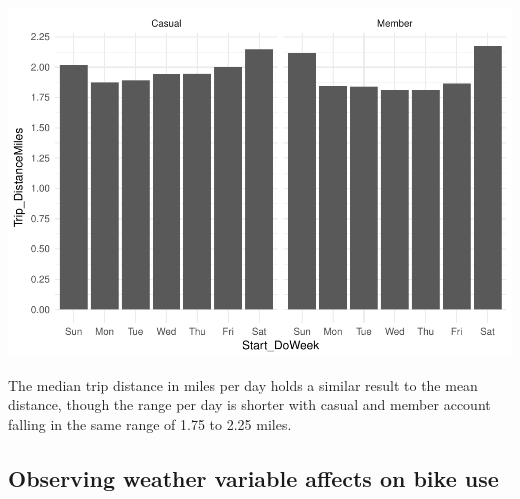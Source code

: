 \documentclass[]{article}
\newenvironment{Shaded}{\begin{snugshade}}{\end{snugshade}}
\newcommand{\KeywordTok}[1]{\textcolor[rgb]{0.13,0.29,0.53}{\textbf{#1}}}
\newcommand{\DataTypeTok}[1]{\textcolor[rgb]{0.13,0.29,0.53}{#1}}
\newcommand{\DecValTok}[1]{\textcolor[rgb]{0.00,0.00,0.81}{#1}}
\newcommand{\FloatTok}[1]{\textcolor[rgb]{0.00,0.00,0.81}{#1}}
\newcommand{\StringTok}[1]{\textcolor[rgb]{0.31,0.60,0.02}{#1}}
\newcommand{\OperatorTok}[1]{\textcolor[rgb]{0.81,0.36,0.00}{\textbf{#1}}}
\newcommand{\NormalTok}[1]{#1}
\begin{document}
\begin{Shaded}
\end{Shaded}

\includegraphics{Nice_Ride_Project_Stat_ReportDRAFT_files/figure-latex/unnamed-chunk-10-1.pdf}

The median trip distance in miles per day holds a similar result to the
mean distance, though the range per day is shorter with casual and
member account falling in the same range of 1.75 to 2.25 miles.

\subsection{Observing weather variable affects on bike
use}\label{observing-weather-variable-affects-on-bike-use}
\end{document}
